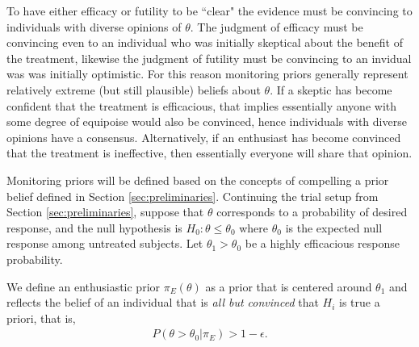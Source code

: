 \documentclass[12pt]{article}
\begin{document}
To have either efficacy or futility to be ``clear" the evidence must be convincing to individuals with diverse opinions of $\theta$. The judgment of efficacy must be convincing even to an individual who was initially skeptical about the benefit of the treatment, likewise the judgment of futility must be convincing to an invidual was was initially optimistic. For this reason monitoring priors generally represent relatively extreme (but still plausible) beliefs about $\theta$. If a skeptic has become confident that the treatment is efficacious, 
that implies essentially anyone with some degree of equipoise would also be convinced, hence individuals with diverse opinions have a consensus. Alternatively, if an enthusiast has become convinced that the treatment is ineffective, then essentially everyone will share that opinion. 

%
%

Monitoring priors will be defined based on the concepts of compelling a prior belief defined in Section \ref{sec:preliminaries}. Continuing the trial setup from Section \ref{sec:preliminaries}, suppose that $\theta$ corresponds to a probability of desired response, and the null hypothesis is $H_0:\theta\leq\theta_0$ where $\theta_0$ is the expected null response among untreated subjects. 
%
Let $\theta_1>\theta_0$ be a highly efficacious response probability.
%

We define an enthusiastic prior $\pi_{E}(\theta)$ as a prior that is centered around $\theta_1$ and reflects the belief of an individual that is \textit{all but convinced} that $H_i$ is true a priori, that is, 
\begin{align}\label{eq:enthprior}
P(\theta >\theta_0| \pi_{E})>1-\epsilon.
\end{align} 
\end{document}
